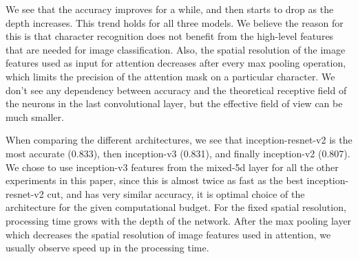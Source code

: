 \documentclass[conference]{IEEEtran}
\begin{document}
We see that  the accuracy improves for a while,
and then starts to drop as the depth increases. This trend holds for all three models.
We believe the reason for this is that
character recognition does not benefit from the high-level features
that are needed for image classification. Also, the spatial resolution of the image features used as input for attention decreases after every max pooling operation, which limits the precision of the attention mask on a particular character. We don't see any dependency between accuracy and the theoretical receptive field of the neurons in the last convolutional layer, but the effective field of view can be much smaller.  


When comparing the different architectures,
we see that inception-resnet-v2 is the most accurate (0.833),
then inception-v3 (0.831),
and finally inception-v2 (0.807).
We chose to use inception-v3 features from the mixed-5d layer for all
the other experiments in this paper,
since this is almost twice as fast as the best inception-resnet-v2 cut,
and has very similar accuracy, it is optimal choice of the architecture for the given computational budget. For the fixed spatial resolution, processing time grows with the depth of the network. After the max pooling layer which decreases the spatial resolution of image features used in attention, we usually observe speed up in the processing time. 
\end{document}
